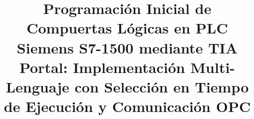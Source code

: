 \documentclass[conference]{IEEEtran}
\begin{document}
\title{Programación Inicial de Compuertas Lógicas en PLC Siemens S7-1500 mediante TIA Portal: Implementación Multi-Lenguaje con Selección en Tiempo de Ejecución y Comunicación OPC}

\author{
}

\maketitle
\end{document}
